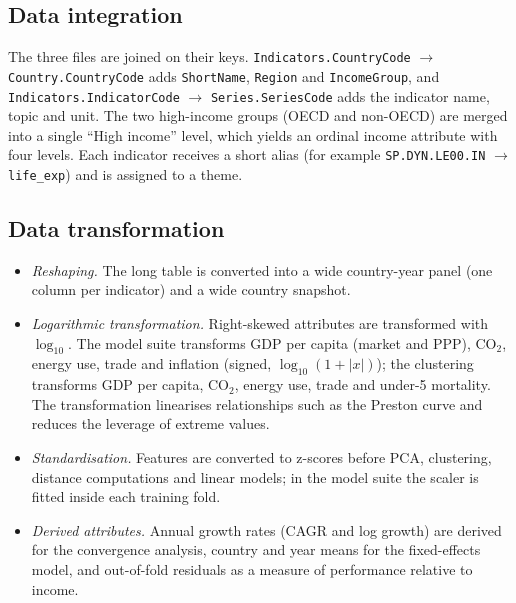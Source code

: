 \documentclass[11pt,a4paper]{article}
\newcommand{\var}[1]{\texttt{#1}}
\begin{document}
\subsection{Data integration}
The three files are joined on their keys. \texttt{Indicators.CountryCode} $\to$ \texttt{Country.CountryCode} adds \var{ShortName}, \var{Region} and \var{IncomeGroup}, and \texttt{Indicators.IndicatorCode} $\to$ \texttt{Series.SeriesCode} adds the indicator name, topic and unit. The two high-income groups (OECD and non-OECD) are merged into a single ``High income'' level, which yields an ordinal income attribute with four levels. Each indicator receives a short alias (for example \var{SP.DYN.LE00.IN} $\to$ \var{life\_exp}) and is assigned to a theme.

\subsection{Data transformation}
\begin{itemize}
\item \emph{Reshaping.} The long table is converted into a wide country-year panel (one column per indicator) and a wide country snapshot.
\item \emph{Logarithmic transformation.} Right-skewed attributes are transformed with $\log_{10}$. The model suite transforms GDP per capita (market and PPP), CO$_2$, energy use, trade and inflation (signed, $\log_{10}(1+|x|)$); the clustering transforms GDP per capita, CO$_2$, energy use, trade and under-5 mortality. The transformation linearises relationships such as the Preston curve and reduces the leverage of extreme values.
\item \emph{Standardisation.} Features are converted to z-scores before PCA, clustering, distance computations and linear models; in the model suite the scaler is fitted inside each training fold.
\item \emph{Derived attributes.} Annual growth rates (CAGR and log growth) are derived for the convergence analysis, country and year means for the fixed-effects model, and out-of-fold residuals as a measure of performance relative to income.
\end{itemize}
\end{document}
